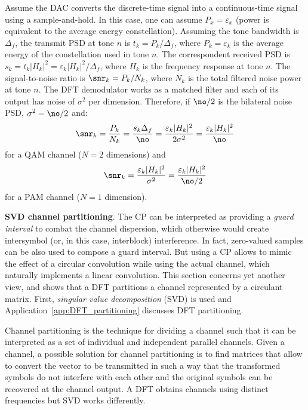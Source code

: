 Assume the DAC converts the discrete-time signal into a continuous-time signal using a sample-and-hold. In this case, one can assume $P_x = \varepsilon_x$ (power is equivalent to the average energy constellation). Assuming the tone bandwidth is $\Delta_f$, the transmit PSD at tone $n$ is $t_k = P_k / \Delta_f$, where $P_k = \varepsilon_k$ is the average energy of the constellation used in tone $n$. The correspondent received PSD is $s_k = t_k |H_k|^2 = \varepsilon_k |H_k|^2 / \Delta_f$, where $H_k$ is the frequency response at tone $n$. The signal-to-noise ratio is $\snr_k = P_k/N_k$, where $N_k$ is the total filtered noise power at tone $n$. The DFT demodulator works as a matched filter and each of its output has noise of $\sigma^2$ per dimension. Therefore, if $\no / 2$ is the bilateral noise PSD, $\sigma^2 = \no / 2$ and:
	 $$
	 \snr_k = \frac{P_k}{N_k} = \frac{s_k \Delta_f}{ \no} = \frac{\varepsilon_k |H_k|^2}{2 \sigma^2} = \frac{\varepsilon_k |H_k|^2}{\no}
	 $$
for a QAM channel ($N=2$ dimensions) and 
	 $$
	 \snr_k = \frac{\varepsilon_k |H_k|^2}{\sigma^2} = \frac{\varepsilon_k |H_k|^2}{\no/2}
	 $$
for a PAM channel ($N=1$ dimension).
\eApplication


\bApplication \textbf{SVD channel partitioning}.
\label{app:SVD_partitioning}
The CP can be interpreted as providing a \emph{guard interval} to combat the channel dispersion, which otherwise would create intersymbol (or, in this case, interblock) interference.
In fact, zero-valued samples can be also used to compose a guard interval. But using a CP allows to mimic the effect of a circular convolution while using the actual channel, which naturally implements a linear convolution. This section concerns yet another view, and shows that a DFT partitions a channel represented by a circulant matrix.
First, \emph{singular value decomposition} (SVD) is used and Application~\ref{app:DFT_partitioning} discusses DFT partitioning.

Channel partitioning is the technique for dividing a channel such that it can be interpreted as a set of individual and independent parallel channels. Given a channel, a possible solution for channel partitioning is to find matrices that allow to convert the vector to be transmitted in such a way that the transformed symbols do not interfere with each other and the original symbols can be recovered at the channel output. A DFT obtains channels using distinct frequencies but SVD works differently.


